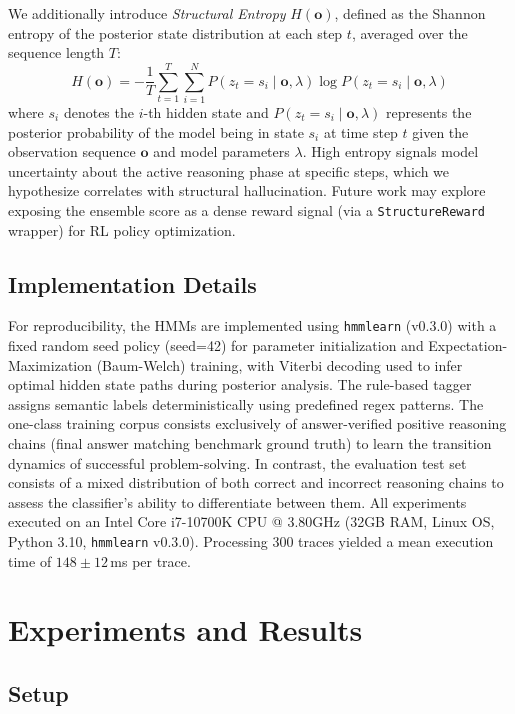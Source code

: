 \documentclass[conference]{IEEEtran}
\begin{document}
We additionally introduce \textit{Structural Entropy} $H(\mathbf{o})$, defined as the Shannon entropy of the posterior state distribution at each step $t$, averaged over the sequence length $T$:
\begin{equation}
H(\mathbf{o}) = -\frac{1}{T} \sum_{t=1}^{T} \sum_{i=1}^{N} P(z_t = s_i \mid \mathbf{o}, \lambda) \log P(z_t = s_i \mid \mathbf{o}, \lambda)
\label{eq:structural_entropy}
\end{equation}
where $s_i$ denotes the $i$-th hidden state and $P(z_t = s_i \mid \mathbf{o}, \lambda)$ represents the posterior probability of the model being in state $s_i$ at time step $t$ given the observation sequence $\mathbf{o}$ and model parameters $\lambda$. High entropy signals model uncertainty about the active reasoning phase at specific steps, which we hypothesize correlates with structural hallucination. Future work may explore exposing the ensemble score as a dense reward signal (via a \texttt{StructureReward} wrapper) for RL policy optimization.

\subsection{Implementation Details}
For reproducibility, the HMMs are implemented using \texttt{hmmlearn} (v0.3.0) with a fixed random seed policy (seed=42) for parameter initialization and Expectation-Maximization (Baum-Welch) training, with Viterbi decoding used to infer optimal hidden state paths during posterior analysis. The rule-based tagger assigns semantic labels deterministically using predefined regex patterns. The one-class training corpus consists exclusively of answer-verified positive reasoning chains (final answer matching benchmark ground truth) to learn the transition dynamics of successful problem-solving. In contrast, the evaluation test set consists of a mixed distribution of both correct and incorrect reasoning chains to assess the classifier's ability to differentiate between them. All experiments executed on an Intel Core i7-10700K CPU @ 3.80GHz (32GB RAM, Linux OS, Python 3.10, \texttt{hmmlearn} v0.3.0). Processing 300 traces yielded a mean execution time of $148 \pm 12$\,ms per trace.

\section{Experiments and Results}

\subsection{Setup}
\end{document}

